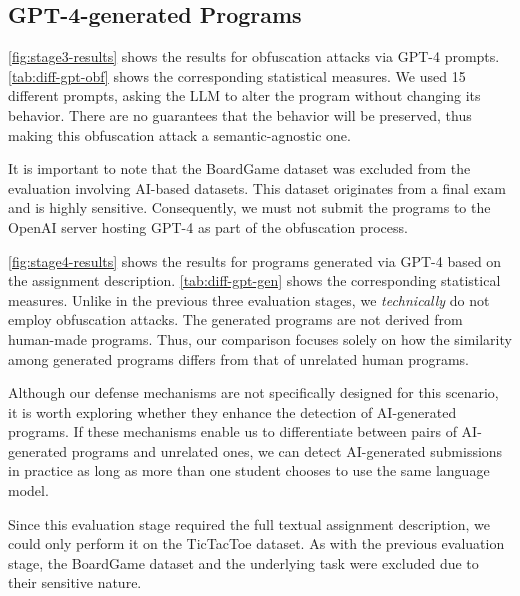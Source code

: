 \subsection{GPT-4-generated Programs}\label{sec:eval-gptgen}

\autoref{fig:stage3-results} shows the results for obfuscation attacks via GPT-4 prompts. 
\autoref{tab:diff-gpt-obf} shows the corresponding statistical measures.
We used 15 different prompts, asking the LLM to alter the program without changing its behavior. %
There are no guarantees that the behavior will be preserved, thus making this obfuscation attack a semantic-agnostic one.

It is important to note that the BoardGame dataset was excluded from the evaluation involving AI-based datasets. This dataset originates from a final exam and is highly sensitive. Consequently, we must not submit the programs to the OpenAI server hosting GPT-4 as part of the obfuscation process.




\autoref{fig:stage4-results} shows the results for programs generated via GPT-4 based on the assignment description.
\autoref{tab:diff-gpt-gen} shows the corresponding statistical measures.
Unlike in the previous three evaluation stages, we \textit{technically} do not employ obfuscation attacks. The generated programs are not derived from human-made programs. 
Thus, our comparison focuses solely on how the similarity among generated programs differs from that of unrelated human programs.

Although our defense mechanisms are not specifically designed for this scenario, it is worth exploring whether they enhance the detection of AI-generated programs.
If these mechanisms enable us to differentiate between pairs of AI-generated programs and unrelated ones, we can detect AI-generated submissions in practice as long as more than one student chooses to use the same language model.

Since this evaluation stage required the full textual assignment description, we could only perform it on the TicTacToe dataset. As with the previous evaluation stage, the BoardGame dataset and the underlying task were excluded due to their sensitive nature.

